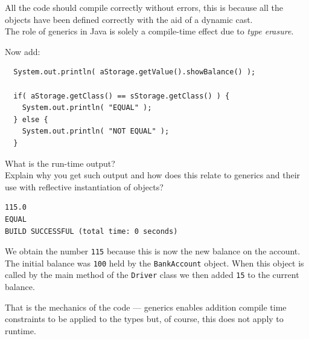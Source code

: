 \documentclass[11pt,a4paper]{exam}
\begin{document}
\begin{questions}
\begin{solution}
All the code should compile correctly without errors, this is because all the objects 
have been defined correctly with the aid of a dynamic cast.\\
The role of generics in Java is solely a compile-time effect due to \emph{type erasure}.
\end{solution}

\item
Now add:
\begin{Verbatim}
  System.out.println( aStorage.getValue().showBalance() );

  if( aStorage.getClass() == sStorage.getClass() ) {
    System.out.println( "EQUAL" );
  } else {
    System.out.println( "NOT EQUAL" );
  }
\end{Verbatim}
\noindent
What is the run-time output? \\
Explain why you get such output and how does this relate to generics and their use with reflective 
instantiation of objects?

\begin{solution}
\begin{Verbatim}
115.0
EQUAL
BUILD SUCCESSFUL (total time: 0 seconds)
\end{Verbatim}

We obtain the number \verb!115! because this is now the new balance on the account.  
The initial balance was \verb!100! held by the \verb!BankAccount! object. When this object 
is called by the main method of the \verb!Driver! class we then added \verb!15! 
to the current balance.

That is the mechanics of the code --- generics enables addition compile time constraints to be 
applied to the types but, of course, this does not apply to runtime.  
	
\end{solution}

\end{questions}
\end{document}
